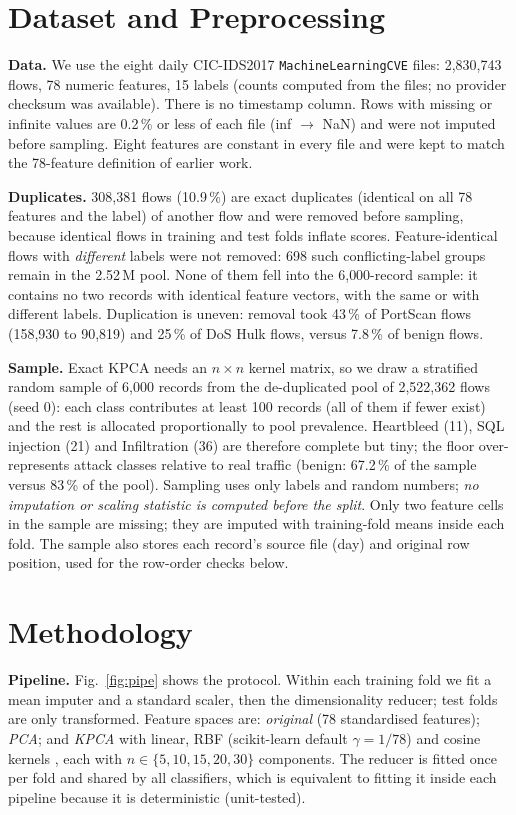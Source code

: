 \documentclass[runningheads]{llncs}
\begin{document}
\section{Dataset and Preprocessing}\label{sec:data}
\textbf{Data.} We use the eight daily CIC-IDS2017 \texttt{MachineLearningCVE} files: 2{,}830{,}743 flows, 78 numeric features, 15 labels (counts computed from the files; no provider checksum was available). There is no timestamp column. Rows with missing or infinite values are 0.2\,\% or less of each file (inf $\to$ NaN) and were not imputed before sampling. Eight features are constant in every file and were kept to match the 78-feature definition of earlier work.

\textbf{Duplicates.} 308{,}381 flows (10.9\,\%) are exact duplicates (identical on all 78 features and the label) of another flow and were removed before sampling, because identical flows in training and test folds inflate scores. Feature-identical flows with \emph{different} labels were not removed: 698 such conflicting-label groups remain in the 2.52\,M pool. None of them fell into the 6{,}000-record sample: it contains no two records with identical feature vectors, with the same or with different labels. Duplication is uneven: removal took 43\,\% of PortScan flows (158{,}930 to 90{,}819) and 25\,\% of DoS Hulk flows, versus 7.8\,\% of benign flows.

\textbf{Sample.} Exact KPCA needs an $n\times n$ kernel matrix, so we draw a stratified random sample of 6{,}000 records from the de-duplicated pool of 2{,}522{,}362 flows (seed 0): each class contributes at least 100 records (all of them if fewer exist) and the rest is allocated proportionally to pool prevalence. Heartbleed (11), SQL injection (21) and Infiltration (36) are therefore complete but tiny; the floor over-represents attack classes relative to real traffic (benign: 67.2\,\% of the sample versus 83\,\% of the pool). Sampling uses only labels and random numbers; \emph{no imputation or scaling statistic is computed before the split}. Only two feature cells in the sample are missing; they are imputed with training-fold means inside each fold. The sample also stores each record's source file (day) and original row position, used for the row-order checks below.



\section{Methodology}\label{sec:method}
\textbf{Pipeline.} Fig.~\ref{fig:pipe} shows the protocol. Within each training fold we fit a mean imputer and a standard scaler, then the dimensionality reducer; test folds are only transformed. Feature spaces are: \emph{original} (78 standardised features); \emph{PCA}; and \emph{KPCA} with linear, RBF (scikit-learn default $\gamma=1/78$) and cosine kernels \cite{scholkopf1998}, each with $n\in\{5,10,15,20,30\}$ components. The reducer is fitted once per fold and shared by all classifiers, which is equivalent to fitting it inside each pipeline because it is deterministic (unit-tested).
\end{document}
